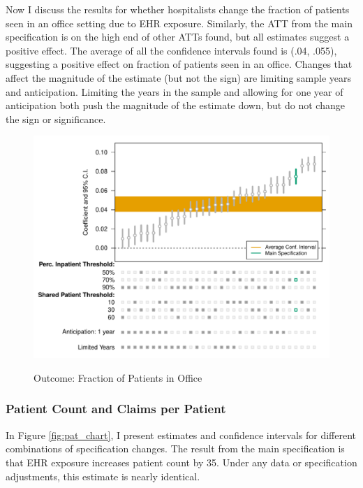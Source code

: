 \documentclass[12pt]{article}
\begin{document}
Now I discuss the results for whether hospitalists change the fraction of patients seen in an office setting due to EHR exposure. Similarly, the ATT from the main specification is on the high end of other ATTs found, but all estimates suggest a positive effect. The average of all the confidence intervals found is (.04, .055), suggesting a positive effect on fraction of patients seen in an office. Changes that affect the magnitude of the estimate (but not the sign) are limiting sample years and anticipation. Limiting the years in the sample and allowing for one year of anticipation both push the magnitude of the estimate down, but do not change the sign or significance. 

\begin{figure}[ht]
    \caption{Outcome: Fraction of Patients in Office}
    \includegraphics[scale=.7]{Objects/office_frac_chart.pdf}
    \label{fig:fracoffice_chart}
\end{figure}


\subsubsection{Patient Count and Claims per Patient}

In Figure \ref{fig:pat_chart}, I present estimates and confidence intervals for different combinations of specification changes. The result from the main specification is that EHR exposure increases patient count by 35. Under any data or specification adjustments, this estimate is nearly identical. 
\end{document}
